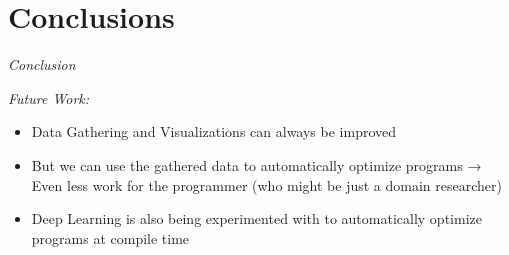 \section{Conclusions}
\textit{Conclusion}

\textit{Future Work:}
\begin{itemize}
	\item Data Gathering and Visualizations can always be improved
	\item But we can use the gathered data to automatically optimize programs \cite{calotoiu2022lifting} → Even less work for the programmer (who might be just a domain researcher)
	\item Deep Learning is also being experimented with to automatically optimize programs at compile time \cite{cummins2021programl}
\end{itemize}